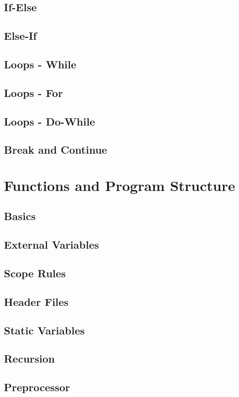 \documentclass{scrartcl}
\begin{document}
        \subsection{If-Else}
        \subsection{Else-If}
        \subsection{Loops - While}
        \subsection{Loops - For}
        \subsection{Loops - Do-While}
        \subsection{Break and Continue}
    \section{Functions and Program Structure}
        \subsection{Basics}
        \subsection{External Variables}
        \subsection{Scope Rules}
        \subsection{Header Files}
        \subsection{Static Variables}
        \subsection{Recursion}
        \subsection{Preprocessor}
\end{document}
